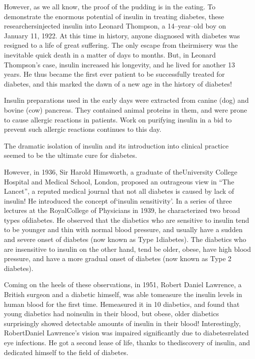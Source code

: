 However, as we all know, the proof of the pudding is in the eating. To demonstrate the enormous potential of insulin in treating diabetes, these researchers\break injected insulin into Leonard Thompson, a 14–year–old boy on January 11, 1922. At this time in history, anyone diagnosed with diabetes was resigned to a life of great suffering. The only es\-cape from their\break misery was the inevitable quick death in a matter of days to months. But, in Leonard Thompson’s case, insulin increased his longevity, and he lived for another 13 years. He thus became the first ever patient to be successfully treated for diabetes, and this marked the dawn of a new age in the history of diabetes!

Insulin preparations used in the early days were extracted from canine (dog) and bovine (cow) pancreas. They contained animal proteins in them, and were prone to cause allergic rea\-ctions in patients. Work on purifying insulin in a bid to prevent such allergic reactions continues to this day.

The dramatic isolation of insulin and its introduction into clinical practice seemed to be the ultimate cure for diabetes.

However, in 1936, Sir Harold Himsworth, a graduate of the\break University College Hospital and Medical School, London, proposed an outrageous view in “The Lancet”, a reputed medical journal that not all diabetes is caused by lack of insulin! He introduced the concept of\break ‘insulin sensitivity’. In a series of three lectures at the Royal\break College of Physicians in 1939, he characte\-rized two broad types of\break diabetes. He observed that the diabe\-tics who are sensitive to insulin tend to be younger and thin with normal blood pressure, and usually have a sudden and severe onset of diabetes (now known as Type 1\break diabetes). The diabetics who are insensitive to insulin on the other hand, tend be older, obese, have high blood pressure, and have a more gradual onset of diabetes (now known as Type 2 diabetes).

Coming on the heels of these observations, in 1951, Robert Daniel Lawrence, a British surgeon and a diabetic himself, was able to\break measure the insulin levels in human blood for the first time. He\break measured it in 10 diabetics, and found that young dia\-betics had no\break insulin in their blood, but obese, older diabetics surprisingly showed detectable amounts of insulin in their blood! Interestingly, Robert\break Daniel Lawre\-nce’s vision was impaired significantly due to diabetes\break related eye infections. He got a second lease of life, thanks to the\break discovery of insulin, and dedicated himself to the field of diabetes.

